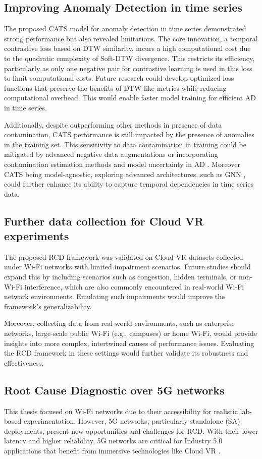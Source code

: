 \subsection*{Improving Anomaly Detection in time series}
The proposed CATS model for anomaly detection in time series demonstrated strong performance but also revealed limitations. The core innovation, a temporal contrastive loss based on \ac{DTW} similarity, incurs a high computational cost due to the quadratic complexity of Soft-DTW divergence. This restricts its efficiency, particularly as only one negative pair for contrastive learning is used in this loss to limit computational costs. Future research could develop optimized loss functions that preserve the benefits of DTW-like metrics while reducing computational overhead. This would enable faster model training for efficient AD in time series. 

Additionally, despite outperforming other methods in presence of data contamination, CATS performance is still impacted by the presence of anomalies in the training set. This sensitivity to data contamination in training could be mitigated by advanced negative data augmentations or incorporating contamination estimation methods and model uncertainty in AD \cite{xu2024calibrated, perini2023estimating}. Moreover CATS being model-agnostic, exploring advanced architectures, such as \ac{GNN} \cite{jin2024survey}, could further enhance its ability to capture temporal dependencies in time series data.

\subsection*{Further data collection for Cloud VR experiments}
The proposed RCD framework was validated on Cloud VR datasets collected under Wi-Fi networks with limited impairment scenarios. Future studies should expand this by including scenarios such as congestion, hidden terminals, or non-Wi-Fi interference, which are also commonly encountered in real-world Wi-Fi network environments. Emulating such impairments would improve the framework’s generalizability.

Moreover, collecting data from real-world environments, such as enterprise networks, large-scale public Wi-Fi (e.g., campuses) or home Wi-Fi, would provide insights into more complex, intertwined causes of performance issues. Evaluating the RCD framework in these settings would further validate its robustness and effectiveness.

\subsection*{Root Cause Diagnostic over 5G networks}
This thesis focused on Wi-Fi networks due to their accessibility for realistic lab-based experimentation. However, 5G networks, particularly standalone (SA) deployments, present new opportunities and challenges for RCD. With their lower latency and higher reliability, 5G networks are critical for Industry 5.0 applications that benefit from immersive technologies like Cloud VR \cite{fernandez2024forging}. 

